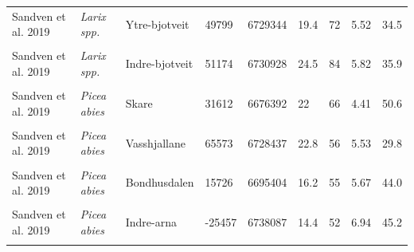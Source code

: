 \documentclass[
]{article}
\begin{document}
\begin{landscape}
\begin{longtable}[t]{l>{}llllllll}
Sandven et al. 2019 & \em{Larix spp.} & Ytre-bjotveit & 49799 & 6729344 & 19.4 & 72 & 5.52 & 34.5\\
\cellcolor{gray!6}{Sandven et al. 2019} & \em{\cellcolor{gray!6}{Larix spp.}} & \cellcolor{gray!6}{Knappeidet} & \cellcolor{gray!6}{-47542} & \cellcolor{gray!6}{6737678} & \cellcolor{gray!6}{17.2} & \cellcolor{gray!6}{32} & \cellcolor{gray!6}{7.99} & \cellcolor{gray!6}{39.4}\\
\addlinespace
Sandven et al. 2019 & \em{Larix spp.} & Indre-bjotveit & 51174 & 6730928 & 24.5 & 84 & 5.82 & 35.9\\
\cellcolor{gray!6}{Sandven et al. 2019} & \em{\cellcolor{gray!6}{Picea abies}} & \cellcolor{gray!6}{Boerve} & \cellcolor{gray!6}{37746} & \cellcolor{gray!6}{6711673} & \cellcolor{gray!6}{31.9} & \cellcolor{gray!6}{64} & \cellcolor{gray!6}{5.49} & \cellcolor{gray!6}{46.6}\\
Sandven et al. 2019 & \em{Picea abies} & Skare & 31612 & 6676392 & 22 & 66 & 4.41 & 50.6\\
\cellcolor{gray!6}{Sandven et al. 2019} & \em{\cellcolor{gray!6}{Picea abies}} & \cellcolor{gray!6}{Oeystese} & \cellcolor{gray!6}{16634} & \cellcolor{gray!6}{6726920} & \cellcolor{gray!6}{15.6} & \cellcolor{gray!6}{57} & \cellcolor{gray!6}{6.42} & \cellcolor{gray!6}{67.4}\\
Sandven et al. 2019 & \em{Picea abies} & Vasshjallane & 65573 & 6728437 & 22.8 & 56 & 5.53 & 29.8\\
\addlinespace
\cellcolor{gray!6}{Sandven et al. 2019} & \em{\cellcolor{gray!6}{Picea abies}} & \cellcolor{gray!6}{Hjelmtveit} & \cellcolor{gray!6}{-31407} & \cellcolor{gray!6}{6756542} & \cellcolor{gray!6}{21.4} & \cellcolor{gray!6}{57} & \cellcolor{gray!6}{7.15} & \cellcolor{gray!6}{57.3}\\
Sandven et al. 2019 & \em{Picea abies} & Bondhusdalen & 15726 & 6695404 & 16.2 & 55 & 5.67 & 44.0\\
\cellcolor{gray!6}{Sandven et al. 2019} & \em{\cellcolor{gray!6}{Picea abies}} & \cellcolor{gray!6}{Saeboe} & \cellcolor{gray!6}{-36690} & \cellcolor{gray!6}{6759365} & \cellcolor{gray!6}{21.2} & \cellcolor{gray!6}{51} & \cellcolor{gray!6}{7.07} & \cellcolor{gray!6}{59.8}\\
Sandven et al. 2019 & \em{Picea abies} & Indre-arna & -25457 & 6738087 & 14.4 & 52 & 6.94 & 45.2\\
\cellcolor{gray!6}{Sandven et al. 2019} & \em{\cellcolor{gray!6}{Picea abies}} & \cellcolor{gray!6}{Kvamskogen} & \cellcolor{gray!6}{4982} & \cellcolor{gray!6}{6726838} & \cellcolor{gray!6}{20.4} & \cellcolor{gray!6}{101} & \cellcolor{gray!6}{4.98} & \cellcolor{gray!6}{57.1}\\

\end{longtable}
\end{landscape}
\end{document}
